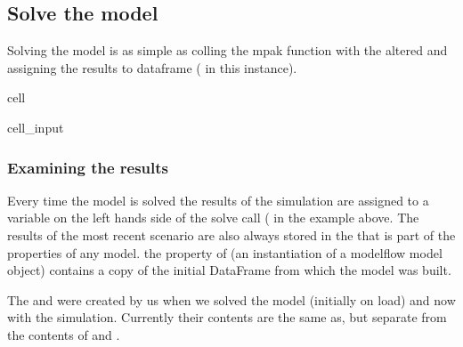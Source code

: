 \documentclass[letterpaper,10pt,english]{jupyterBook}
\begin{document}
\subsection{Solve the model}
\label{\detokenize{content/05_WBModels/MoreComplexScenarios:solve-the-model}}
\sphinxAtStartPar
Solving the model is as simple as colling the mpak function with the altered  and assigning the results to dataframe ( in this instance).

\begin{sphinxuseclass}{cell}\begin{sphinxVerbatimInput}

\begin{sphinxuseclass}{cell_input}
\begin{sphinxVerbatim}[commandchars=\\\{\}]
   
\end{sphinxVerbatim}

\end{sphinxuseclass}\end{sphinxVerbatimInput}

\end{sphinxuseclass}

\subsubsection{Examining the results}
\label{\detokenize{content/05_WBModels/MoreComplexScenarios:examining-the-results}}
\sphinxAtStartPar
Every time the model is solved the results of the simulation are assigned to a variable on the left hands side of the solve call ( in the example above.  The results of the most recent scenario are also always stored in the   that is part of the properties of any  model. the  property of  (an instantiation of a modelflow model object) contains a copy of the initial DataFrame from which the model was built.

\sphinxAtStartPar
The   and  were created by us when we solved the model (initially on load) and now with the simulation.  Currently their contents are the same as, but separate from the contents of  and .
\end{document}
